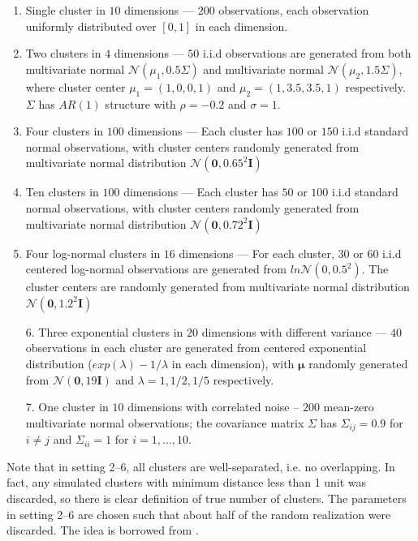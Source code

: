 \documentclass[11pt]{article}
\begin{document}
\begin{enumerate}

  \item Single cluster in $10$ dimensions --- $200$ observations, each
    observation uniformly distributed over $[0,1]$ in each dimension. 

  \item Two clusters in $4$ dimensions --- $50$ i.i.d
    observations are generated from both multivariate normal
    $\mathcal{N}\left(\mu_1,0.5\Sigma\right)$ and multivariate normal
    $\mathcal{N}\left(\mu_2,1.5\Sigma\right)$, where 
    cluster center $\mu_1 = (1,0,0,1)$ and $\mu_2 =(1,3.5,3.5,1)$
    respectively. $\Sigma$ has $AR(1)$ structure with $\rho=-0.2$ and $\sigma=1$.

  \item Four clusters in $100$ dimensions ---  Each cluster has $100$ or $150$
    i.i.d standard normal observations, with cluster centers randomly
    generated from multivariate normal distribution
    $\mathcal{N}\left(\mathbf{0},0.65^2\mathbf{I}\right)$

  \item Ten clusters in $100$ dimensions ---  Each cluster has $50$ or $100$
    i.i.d standard normal observations, with cluster centers randomly
    generated from multivariate normal distribution
    $\mathcal{N}\left(\mathbf{0},0.72^2\mathbf{I}\right)$

  \item Four log-normal clusters in $16$ dimensions --- For each cluster, $30$
    or $60$ i.i.d centered log-normal observations are generated from
    $ln\mathcal{N}\left(0,0.5^2 \right)$. The cluster centers are randomly
    generated from multivariate normal distribution
    $\mathcal{N}\left(\mathbf{0},1.2^2\mathbf{I}\right)$

  \item[6.] Three exponential clusters in $20$ dimensions with different
    variance --- $40$ observations in each cluster are generated from centered
    exponential distribution ($exp(\lambda)-1/\lambda$ in each dimension),
    with $\boldsymbol\mu$ randomly generated from
    $\mathcal{N}\left(\mathbf{0},19\mathbf{I}\right)$ and $\lambda = 1, 1/2,
    1/5$ respectively.

  \item[7.] One cluster in $10$ dimensions with correlated noise -- $200$
    mean-zero multivariate normal observations; the covariance matrix $\Sigma$
    has $\Sigma_{ij} = 0.9$ for $i \neq j$ and $\Sigma_{ii} = 1$ for $i = 1,
    \dotsc, 10$.
\end{enumerate}
Note that in setting 2--6, all clusters are well-separated, i.e. no
overlapping. In fact, any simulated clusters with minimum distance less than
1 unit was discarded, so there is clear definition of true number of
clusters. The parameters in setting 2--6 are chosen such that about half of
the random realization were discarded. The idea is borrowed from
\cite{tibshirani2001estimating}.
\end{document}
